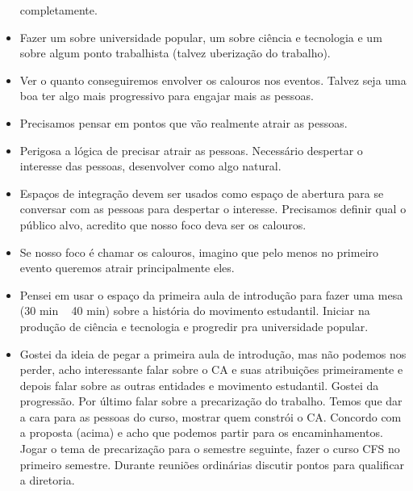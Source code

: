 \documentclass{ata-calico}
\begin{document}
\begin{itemize}
  completamente.
\item Fazer um sobre universidade popular, um sobre ciência e tecnologia e um sobre
  algum ponto trabalhista (talvez uberização do trabalho).
\item Ver o quanto conseguiremos envolver os calouros nos eventos. Talvez seja uma
  boa ter algo mais progressivo para engajar mais as pessoas.
\item Precisamos pensar em pontos que vão realmente atrair as pessoas.
\item Perigosa a lógica de precisar atrair as pessoas. Necessário despertar o
  interesse das pessoas, desenvolver como algo natural.
\item Espaços de integração devem ser usados como espaço de abertura para se
  conversar com as pessoas para despertar o interesse.  Precisamos definir qual
  o público alvo, acredito que nosso foco deva ser os calouros.
\item Se nosso foco é chamar os calouros, imagino que pelo menos no primeiro evento
  queremos atrair principalmente eles.
\item Pensei em usar o espaço da primeira aula de introdução para fazer uma mesa
  (30 min ~ 40 min) sobre a história do movimento estudantil.  Iniciar na
  produção de ciência e tecnologia e progredir pra universidade popular.
\item Gostei da ideia de pegar a primeira aula de introdução, mas não podemos nos
  perder, acho interessante falar sobre o CA e suas atribuições primeiramente e
  depois falar sobre as outras entidades e movimento estudantil. Gostei da
  progressão. Por último falar sobre a precarização do trabalho.  Temos que dar
  a cara para as pessoas do curso, mostrar quem constrói o CA. Concordo com a
  proposta (acima) e acho que podemos partir para os encaminhamentos. Jogar o
  tema de precarização para o semestre seguinte, fazer o curso CFS no primeiro
  semestre.  Durante reuniões ordinárias discutir pontos para qualificar a
  diretoria.
\end{itemize}
\end{document}
